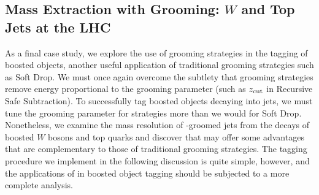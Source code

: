 \subsection{Mass Extraction with Grooming: \texorpdfstring{\(W\)}{W} and Top Jets at the LHC}
\label{sec:pira-mass}

    As a final case study, we explore the use of \PIRANHA{} grooming strategies in the tagging of boosted objects, another useful application of traditional grooming strategies such as Soft Drop.
   We must once again overcome the subtlety that \PIRANHA{} grooming strategies remove energy proportional to the grooming parameter (such as \(z_{\rm cut}\) in Recursive Safe Subtraction).
   To successfully tag boosted objects decaying into jets, we must tune the grooming parameter for \PIRANHA{} strategies more than we would for Soft Drop.
   Nonetheless, we examine the mass resolution of \PIRANHA{}-groomed jets from the decays of boosted \(W\) bosons and top quarks and discover that \PIRANHA{} may offer some advantages that are complementary to those of traditional grooming strategies.
   The tagging procedure we implement in the following discussion is quite simple, however, and the applications of \PIRANHA{} in boosted object tagging should be subjected to a more complete analysis.


